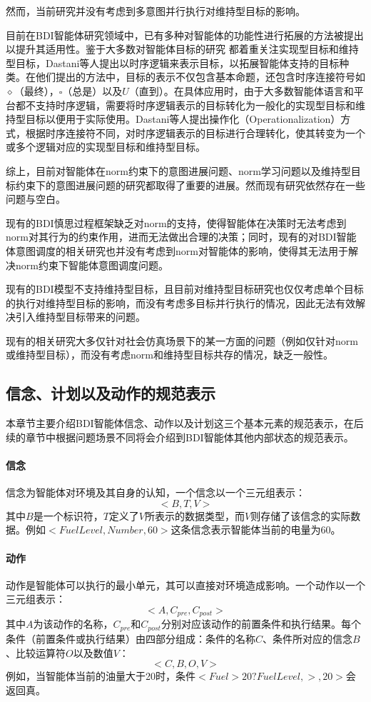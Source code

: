 然而，当前研究并没有考虑到多意图并行执行对维持型目标的影响。

目前在BDI智能体研究领域中，已有多种对智能体的功能性进行拓展的方法被提出以提升其适用性。鉴于大多数对智能体目标的研究 都着重关注实现型目标和维持型目标，Dastani等人提出以时序逻辑来表示目标，以拓展智能体支持的目标种类。在他们提出的方法中，目标的表示不仅包含基本命题，还包含时序连接符号如$\diamond$（最终），$\square$（总是）以及$U$（直到）。在具体应用时，由于大多数智能体语言和平台都不支持时序逻辑，需要将时序逻辑表示的目标转化为一般化的实现型目标和维持型目标以便用于实际使用。Dastani等人提出操作化（Operationalization）方式，根据时序连接符不同，对时序逻辑表示的目标进行合理转化，使其转变为一个或多个逻辑对应的实现型目标和维持型目标。

综上，目前对智能体在norm约束下的意图进展问题、norm学习问题以及维持型目标约束下的意图进展问题的研究都取得了重要的进展。然而现有研究依然存在一些问题与空白。

现有的BDI慎思过程框架缺乏对norm的支持，使得智能体在决策时无法考虑到norm对其行为的约束作用，进而无法做出合理的决策；同时，现有的对BDI智能体意图调度的相关研究也并没有考虑到norm对智能体的影响，使得其无法用于解决norm约束下智能体意图调度问题。

现有的BDI模型不支持维持型目标，且目前对维持型目标研究也仅仅考虑单个目标的执行对维持型目标的影响，而没有考虑多目标并行执行的情况，因此无法有效解决引入维持型目标带来的问题。

现有的相关研究大多仅针对社会仿真场景下的某一方面的问题（例如仅针对norm或维持型目标），而没有考虑norm和维持型目标共存的情况，缺乏一般性。

\subsection{信念、计划以及动作的规范表示}
本章节主要介绍BDI智能体信念、动作以及计划这三个基本元素的规范表示，在后续的章节中根据问题场景不同将会介绍到BDI智能体其他内部状态的规范表示。
\paragraph{信念}
信念为智能体对环境及其自身的认知，一个信念以一个三元组表示：
$$<B,T,V>$$
其中$B$是一个标识符，$T$定义了$V$所表示的数据类型，而$V$则存储了该信念的实际数据。例如$<FuelLevel,Number,60>$这条信念表示智能体当前的电量为60。
\paragraph{动作}
动作是智能体可以执行的最小单元，其可以直接对环境造成影响。一个动作以一个三元组表示：
$$<A,C_{pre},C_{post}>$$
其中$A$为该动作的名称，$C_{pre}$和$C_{post}$分别对应该动作的前置条件和执行结果。每个条件（前置条件或执行结果）由四部分组成：条件的名称$C$、条件所对应的信念$B$、比较运算符$O$以及数值$V$：
$$<C,B,O,V>$$
例如，当智能体当前的油量大于20时，条件$<Fuel>20? FuelLevel,>,20>$会返回真。
